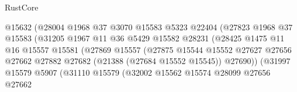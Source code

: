 \begin{lexlean}{RustCore}
\begin{coremodule}
                                        @15632
                                        (@28004
                                          @1968
                                          @37
                                          @3070
                                          @15583
                                          @5323
                                          @22404
                                          (@27823
                                            @1968
                                            @37
                                            @15583
                                            (@31205
                                              @1967
                                              @11
                                              @36
                                              @5429
                                              @15582
                                              @28231
                                              (@28425
                                                @1475
                                                @11
                                                @16
                                                @15557
                                                @15581
                                                (@27869
                                                  @15557
                                                  (@27875
                                                    @15544
                                                    @15552
                                                    @27627
                                                    @27656
                                                    @27662
                                                    @27882
                                                    @27682
                                                    (@21388 (@27684 @15552 @15545))
                                                    @27690))
                                                (@31997
                                                  @15579
                                                  @5907
                                                  (@31110
                                                    @15579
                                                    (@32002
                                                      @15562
                                                      @15574
                                                      @28099
                                                      @27656
                                                      @27662

\end{coremodule}
\end{lexlean}
